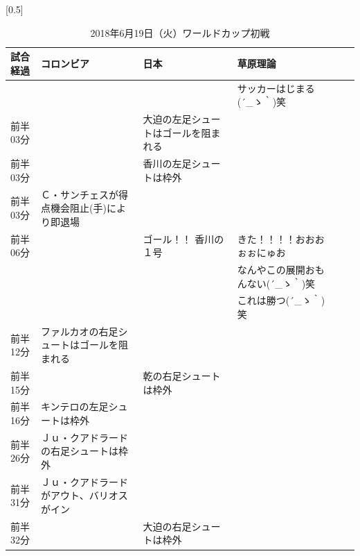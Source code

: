 \begin{table}[htb]
  \centering
  \caption{2018年6月19日（火）ワールドカップ初戦}
  \label{my-label}
  \scalebox{0.5}[0.5]{
    \begin{tabular}{|l|l|l|l|l|l|} \hline
      試合経過  & コロンビア                                   & 日本                                 & 草原理論  \\ \hline \hline
                &                                              &                                       & サッカーはじまる\sf(´\_ゝ｀)笑 \\ \hline \hline
      前半03分  &                                              & 大迫の左足シュートはゴールを阻まれる  &                                  \\ \hline
      前半03分  &                                              & 香川の左足シュートは枠外              &                                  \\ \hline
      前半03分  & Ｃ・サンチェスが得点機会阻止(手)により即退場 &                                       &                                   \\ \hline
      前半06分  &                                              & ゴール！！ 香川の１号                 & きた！！！！おおおぉぉにゅお  \\ \hline
                &                                              &                                       & なんやこの展開おもんない\sf (´\_ゝ｀)笑\\ \hline
                &                                              &                                       & これは勝つ\sf (´\_ゝ｀)笑\\ \hline
      前半12分  & ファルカオの右足シュートはゴールを阻まれる   &                                       &   \\ \hline
      前半15分  &                                              & 乾の右足シュートは枠外                &    \\ \hline
      前半16分  & キンテロの左足シュートは枠外                 &                                       & \\ \hline
      前半26分  & Ｊｕ・クアドラードの右足シュートは枠外       &                                       & \\ \hline
      前半31分  & Ｊｕ・クアドラードがアウト、バリオスがイン   &                                       & \\ \hline
      前半32分  &                                              & 大迫の右足シュートは枠外              & \\ \hline

\end{tabular}}
\end{table}
